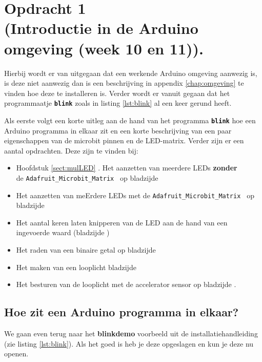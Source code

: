 \chapter{Opdracht 1\\  \small (Introductie in de Arduino omgeving (week 10 en 11)).}
\label{chap:intr}

Hierbij wordt er van uitgegaan dat een werkende Arduino omgeving aanwezig is, is deze niet aanwezig dan is een beschrijving in appendix \ref{chap:omgeving} te vinden hoe deze te installeren is. Verder wordt er vanuit gegaan dat het programmaatje \texttt{\textbf{blink}} zoals in listing \ref{lst:blink} al een keer gerund heeft.


Als eerste volgt een korte uitleg aan de hand van het programma \texttt{\textbf{blink}} hoe een Arduino programma in elkaar zit en een korte beschrijving van een paar eigenschappen van de microbit pinnen en de LED-matrix. Verder zijn er een aantal opdrachten. Deze zijn te vinden bij:

\begin{itemize}
	\item Hoofdstuk \ref{sect:mulLED} . Het aanzetten van meerdere LEDs\textbf{ zonder}\\ de \texttt{Adafruit\_Microbit\_Matrix } op bladzijde \pageref{sect:mulLED}
	\item Het aanzetten van meErdere LEDs met de \texttt{Adafruit\_Microbit\_Matrix } op bladzijde \pageref{blz:opdrmLEDSmatrix}
	\item Het aantal keren laten knipperen van de LED aan de hand van een ingevoerde waard (bladzijde \pageref{blad:aantalknipper} )
	\item Het raden van een binaire getal op bladzijde \pageref{blz:bineairGetal}
	\item Het maken van een looplicht bladzijde  \pageref{opdr:loppl}
	\item Het besturen van de looplicht met de accelerator sensor op bladzijde \pageref{opdr:accSens}.
\end{itemize} 


\section{ Hoe zit een Arduino programma in elkaar?}\label{sec:blink}

We gaan even terug naar het \textbf{blinkdemo} voorbeeld uit de installatiehandleiding (zie listing \ref{lst:blink}).  Als het goed is heb je deze opgeslagen en kun je deze nu openen.

